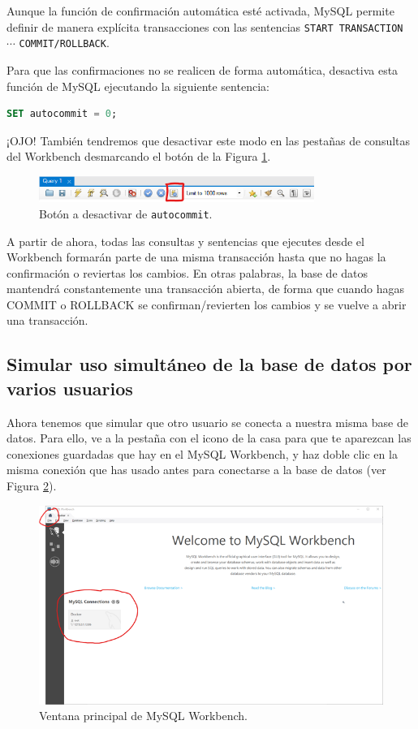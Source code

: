 \documentclass[a4paper]{article}
\begin{document}
Aunque la función de confirmación automática esté activada, MySQL permite definir de manera explícita transacciones con las sentencias \texttt{START TRANSACTION} $\cdots$ \texttt{COMMIT/ROLLBACK}.

Para que las confirmaciones no se realicen de forma automática, desactiva esta función de MySQL ejecutando la siguiente sentencia:

\begin{lstlisting}[language=SQL]
SET autocommit = 0;
\end{lstlisting}

¡OJO! También tendremos que desactivar este modo en las pestañas de consultas del Workbench desmarcando el botón de la Figura \ref{fig:autoejecución}.

\begin{figure}[ht]
    \centering
    \includegraphics[width=0.8\textwidth]{figs/autoejecucion.png}
    \caption{Botón a desactivar de \texttt{autocommit}.}\label{fig:autoejecución}
\end{figure}

A partir de ahora, todas las consultas y sentencias que ejecutes desde el Workbench formarán parte de una misma transacción hasta que no hagas la confirmación o reviertas los cambios. En otras palabras, la base de datos mantendrá constantemente una transacción abierta, de forma que cuando hagas COMMIT o ROLLBACK se confirman/revierten los cambios y se vuelve a abrir una transacción.

\subsection*{Simular uso simultáneo de la base de datos por varios usuarios}

Ahora tenemos que simular que otro usuario se conecta a nuestra misma base de datos. Para ello, ve a la pestaña con el icono de la casa para que te aparezcan las conexiones guardadas que hay en el MySQL Workbench, y haz doble clic en la misma conexión que has usado antes para conectarse a la base de datos (ver Figura \ref{fig:mysqlwork}).

\begin{figure}[ht]
    \centering
    \includegraphics[width=0.9\columnwidth]{figs/mysqlwork.png}
    \caption{Ventana principal de MySQL Workbench.}\label{fig:mysqlwork}
\end{figure}
\end{document}
